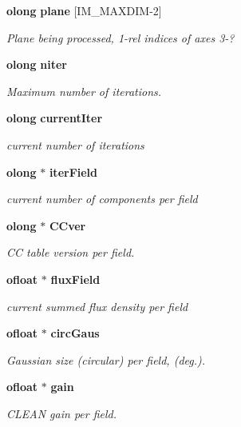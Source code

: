 \begin{CompactItemize}
{\bf olong} {\bf plane} [IM\_\-MAXDIM-2]
\begin{CompactList}\small\item\em Plane being processed, 1-rel indices of axes 3-? \item\end{CompactList}\item 
{\bf olong} {\bf niter}
\begin{CompactList}\small\item\em Maximum number of iterations. \item\end{CompactList}\item 
{\bf olong} {\bf current\-Iter}
\begin{CompactList}\small\item\em current number of iterations \item\end{CompactList}\item 
{\bf olong} $\ast$ {\bf iter\-Field}
\begin{CompactList}\small\item\em current number of components per field \item\end{CompactList}\item 
{\bf olong} $\ast$ {\bf CCver}
\begin{CompactList}\small\item\em CC table version per field. \item\end{CompactList}\item 
{\bf ofloat} $\ast$ {\bf flux\-Field}
\begin{CompactList}\small\item\em current summed flux density per field \item\end{CompactList}\item 
{\bf ofloat} $\ast$ {\bf circ\-Gaus}
\begin{CompactList}\small\item\em Gaussian size (circular) per field, (deg.). \item\end{CompactList}\item 
{\bf ofloat} $\ast$ {\bf gain}
\begin{CompactList}\small\item\em CLEAN gain per field. \item\end{CompactList}\item 

\end{CompactItemize}
